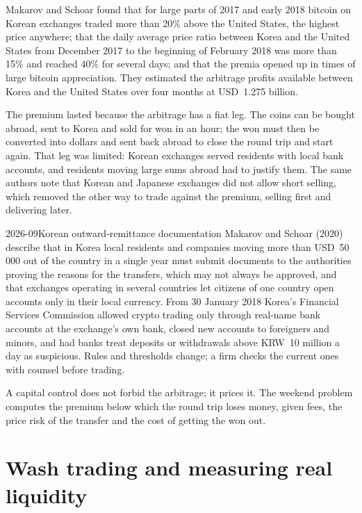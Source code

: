 Makarov and Schoar found that for large parts of 2017 and early 2018 bitcoin on Korean exchanges traded more
than 20\% above the United States, the highest price anywhere; that the daily average price ratio between Korea
and the United States from December 2017 to the beginning of February 2018 was more than 15\% and reached 40\%
for several days; and that the premia opened up in times of large bitcoin appreciation. They estimated the
arbitrage profits available between Korea and the United States over four months at USD~1.275 billion.

The premium lasted because the arbitrage has a fiat leg. The coins can be bought abroad, sent to Korea and sold
for won in an hour; the won must then be converted into dollars and sent back abroad to close the round trip and
start again. That leg was limited: Korean exchanges served residents with local bank accounts, and residents
moving large sums abroad had to justify them. The same authors note that Korean and Japanese exchanges did not
allow short selling, which removed the other way to trade against the premium, selling first and delivering later.

\begin{dated}{2026-09}{Korean outward-remittance documentation}\label{dat:m3:spot-markets:korea}
Makarov and Schoar (2020) describe that in Korea local residents and companies moving more than USD~50\,000 out
of the country in a single year must submit documents to the authorities proving the reasons for the transfers,
which may not always be approved, and that exchanges operating in several countries let citizens of one country
open accounts only in their local currency. From 30 January 2018 Korea's Financial Services Commission allowed
crypto trading only through real-name bank accounts at the exchange's own bank, closed new accounts to foreigners and
minors, and had banks treat deposits or withdrawals above KRW~10 million a day as suspicious. Rules and thresholds change; a firm checks the current ones with
counsel before trading.
\end{dated}

A capital control does not forbid the arbitrage; it prices it. The weekend problem computes the premium below
which the round trip loses money, given fees, the price risk of the transfer and the cost of getting the won out.

\section{Wash trading and measuring real liquidity}


